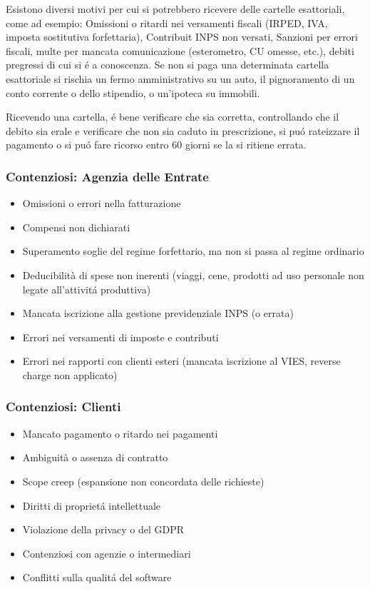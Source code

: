 \documentclass{article}
\begin{document}
Esistono diversi motivi per cui si potrebbero ricevere delle cartelle esattoriali, come ad esempio: Omissioni o ritardi nei versamenti fiscali (IRPED, IVA, imposta sostitutiva forfettaria), Contribuit INPS non versati, Sanzioni per errori fiscali, multe per mancata comunicazione (esterometro, CU omesse, etc.), debiti pregressi di cui si \'e a conoscenza. Se non si paga una determinata cartella esattoriale si rischia un fermo amministrativo su un auto, il pignoramento di un conto corrente o dello stipendio, o un'ipoteca su immobili. 

Ricevendo una cartella, \'e bene verificare che sia corretta, controllando che il debito sia erale e verificare che non sia caduto in prescrizione, si pu\'o rateizzare il pagamento o si pu\'o fare ricorso entro 60 giorni se la si ritiene errata. 

\subsubsection{Contenziosi: Agenzia delle Entrate}
\begin{itemize}
    \item Omissioni o errori nella fatturazione
    \item Compensi non dichiarati
    \item Superamento soglie del regime forfettario, ma non si passa al regime ordinario
    \item Deducibilità di spese non inerenti (viaggi, cene, prodotti ad uso personale non legate all'attivit\'a produttiva)
    \item Mancata iscrizione alla gestione previdenziale INPS (o errata)
    \item Errori nei versamenti di imposte e contributi
    \item Errori nei rapporti con clienti esteri (mancata iscrizione al VIES, reverse charge non applicato)
\end{itemize}

\subsubsection{Contenziosi: Clienti}
\begin{itemize}
    \item Mancato pagamento o ritardo nei pagamenti
    \item Ambiguità o assenza di contratto
    \item Scope creep (espansione non concordata delle richieste)
    \item Diritti di propriet\'a intellettuale
    \item Violazione della privacy o del GDPR
    \item Contenziosi con agenzie o intermediari
    \item Conflitti sulla qualit\'a del software
\end{itemize}
\end{document}
